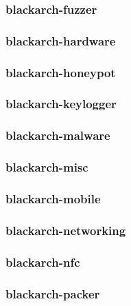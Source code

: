 \documentclass[a4paper, oneside, 11pt]{book}
\begin{document}
\subsubsection{blackarch-fuzzer}



\subsubsection{blackarch-hardware}



\subsubsection{blackarch-honeypot}



\subsubsection{blackarch-keylogger}



\subsubsection{blackarch-malware}



\subsubsection{blackarch-misc}



\subsubsection{blackarch-mobile}



\subsubsection{blackarch-networking}



\subsubsection{blackarch-nfc}



\subsubsection{blackarch-packer}
\end{document}
